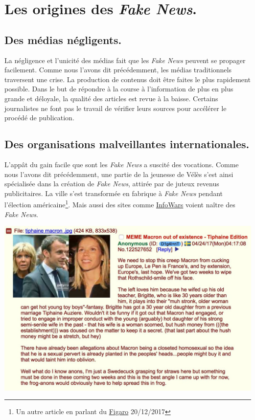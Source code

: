 \documentclass[11pt,a4paper,oldfontcommands]{memoir}
\begin{document}
\section{Les origines des \textit{Fake News}.}

\subsection{Des médias négligents.}
La négligence et l'unicité des médias fait que les \textit{Fake News} peuvent se propager facilement.
Comme nous l'avons dit précédemment, les médias traditionnels traversent une crise.
La production de contenus doit être faites le plus rapidement possible.
Dans le but de répondre à la course à l'information de plus en plus grande et déloyale, la qualité des articles est revue à la baisse.
Certains journalistes ne font pas le travail de vérifier leurs sources pour accélérer le procédé de publication.



\subsection{Des organisations malveillantes internationales.}
L'appât du gain facile que sont les \textit{Fake News} a suscité des vocations.
Comme nous l'avons dit précédemment, une partie de la jeunesse de Vélès s'est ainsi spécialisée dans la création de \textit{Fake News}, attirée par de juteux revenus publicitaires. La ville s'est transformée en fabrique à \textit{Fake News} pendant l'élection américaine\footnote{Un autre article en parlant du \href{http://www.lefigaro.fr/actualite-france/2017/03/06/01016-20170306ARTFIG00187-fake-news-un-meme-terme-pour-plusieurs-realites.php}{Figaro} 20/12/2017 }.
Mais aussi des sites comme \href{https://www.infowars.com/}{InfoWars} voient naître des \textit{Fake News}.

\begin{center}
 \includegraphics[scale=0.20]{../../img/rumeur_4chan/macron.jpg}
 \label{macron}
\end{center}
\end{document}
